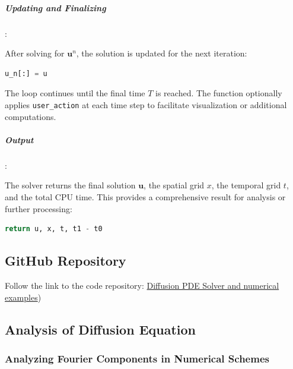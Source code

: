 \documentclass{article}
\begin{document}
			
			
			\subparagraph{Updating and Finalizing}:
			
			After solving for \(\mathbf{u}^{n}\), the solution is updated for the next iteration:
			\begin{lstlisting}[language=Python]
				u_n[:] = u
			\end{lstlisting}
			
			The loop continues until the final time \(T\) is reached. The function optionally applies \texttt{user\_action} at each time step to facilitate visualization or additional computations.
			
			\subparagraph{Output}:
			
			The solver returns the final solution \(\mathbf{u}\), the spatial grid \(x\), the temporal grid \(t\), and the total CPU time. This provides a comprehensive result for analysis or further processing:
			\begin{lstlisting}[language=Python]
				return u, x, t, t1 - t0
			\end{lstlisting}
			

			\newpage
		\subsection{GitHub Repository}
		
		Follow the link to the code repository: \href{https://github.com/pb96git/Numerical-Solutions-for-Partial-Differential-Equations/tree/main/Part_3_DiffusionEquations/Code}{Diffusion PDE Solver and numerical examples})
		
		\subsection{Analysis of Diffusion Equation}
			\subsubsection{Analyzing Fourier Components in Numerical Schemes}
			
\end{document}
